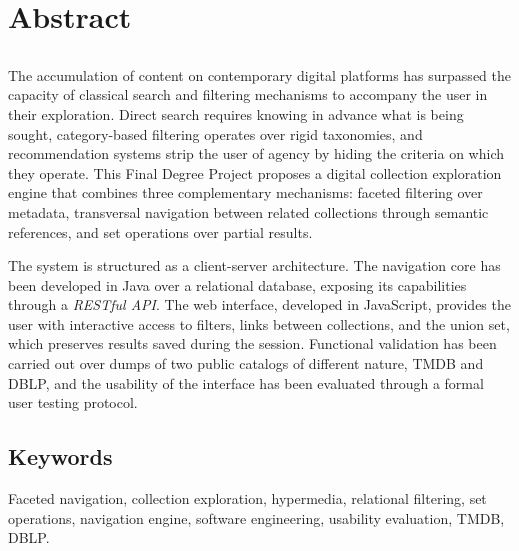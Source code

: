 \chapter*{Abstract}

\section*{\tituloPortadaEngVal}

The accumulation of content on contemporary digital platforms has surpassed the capacity of
classical search and filtering mechanisms to accompany the user in their exploration. Direct
search requires knowing in advance what is being sought, category-based filtering operates over
rigid taxonomies, and recommendation systems strip the user of agency by hiding the criteria
on which they operate. This Final Degree Project proposes a digital collection exploration
engine that combines three complementary mechanisms: faceted filtering over metadata,
transversal navigation between related collections through semantic references, and set
operations over partial results.

The system is structured as a client-server architecture. The navigation core has been
developed in Java over a relational database, exposing its capabilities through a
\textit{RESTful API}. The web interface, developed in JavaScript, provides the user with
interactive access to filters, links between collections, and the union set, which preserves
results saved during the session. Functional validation has been carried out over dumps of two
public catalogs of different nature, TMDB and DBLP, and the usability of the interface has
been evaluated through a formal user testing protocol.


\section*{Keywords}

\noindent Faceted navigation, collection exploration, hypermedia, relational filtering, set
operations, navigation engine, software engineering, usability evaluation, TMDB, DBLP.
